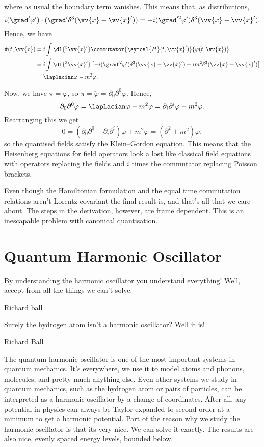 \documentclass[fleqn]{NotesClass}
\newcommand{\dalembertian}{\partial^2}
\newcommand{\hamiltonianDensity}{\symcal{H}}
\begin{document}
    where as usual the boundary term vanishes.
    This means that, as distributions,
    \begin{equation}
        i(\grad'\varphi') \cdot (\grad'\delta^3(\vv{x} - \vv{x}')) = -i(\grad'^2\varphi')\delta^3(\vv{x} - \vv{x}').
    \end{equation}
    Hence, we have
    \begin{align}
        \dot{\pi}(t, \vv{x}) &= i \int \dl{^3\vv{x}'} \commutator{\hamiltonianDensity(t, \vv{x}')}{\varphi(t, \vv{x})}\\
        &= i \int \dl{^3\vv{x}'} \left[ -i(\grad'^2\varphi') \delta^3(\vv{x} - \vv{x}') + im^2 \delta^3(\vv{x} - \vv{x}')\right]\\
        &= \laplacian\varphi - m^2\varphi.
    \end{align}
    
    Now, we have \(\pi = \dot{\varphi}\), so \(\dot{\pi} = \ddot{\varphi} = \partial_0\partial^0 \varphi\).
    Hence,
    \begin{equation}
        \partial_0\partial^0 \varphi = \laplacian\varphi - m^2\varphi = \partial_i\partial^i \varphi - m^2\varphi.
    \end{equation}
    Rearranging this we get
    \begin{equation}
        0 = (\partial_0\partial^0 - \partial_i\partial^i)\varphi + m^2\varphi = (\dalembertian + m^2)\varphi,
    \end{equation}
    so the quantised fields satisfy the Klein--Gordon equation.
    This means that the Heisenberg equations for field operators look a lost like classical field equations with operators replacing the fields and \(i\) times the commutator replacing Poisson brackets.
    
    Even though the Hamiltonian formulation and the equal time commutation relations aren't Lorentz covariant the final result is, and that's all that we care about.
    The steps in the derivation, however, are frame dependent.
    This is an inescapable problem with canonical quantisation.
    
    \chapter{Quantum Harmonic Oscillator}
    \epigraph{By understanding the harmonic oscillator you understand everything! Well, accept from all the things we can't solve.}{Richard ball}
    \epigraph{Surely the hydrogen atom isn't a harmonic oscillator? Well it is!}{Richard Ball}
    The quantum harmonic oscillator is one of the most important systems in quantum mechanics.
    It's everywhere, we use it to model atoms and phonons, molecules, and pretty much anything else.
    Even other systems we study in quantum mechanics, such as the hydrogen atom or pairs of particles, can be interpreted as a harmonic oscillator by a change of coordinates.
    After all, any potential in physics can always be Taylor expanded to second order at a minimum to get a harmonic potential.
    Part of the reason why we study the harmonic oscillator is that its very nice.
    We can solve it exactly.
    The results are also nice, evenly spaced energy levels, bounded below.
    
\end{document}
